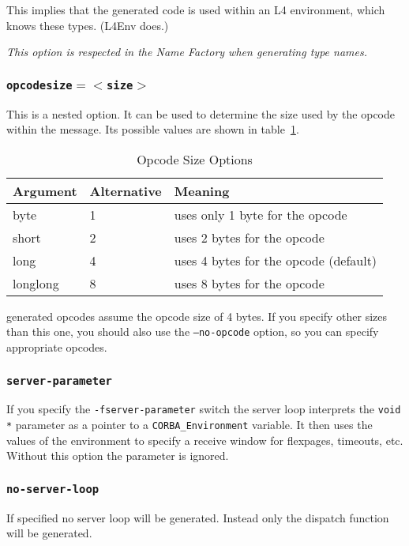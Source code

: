 This implies that the generated code is used within an L4 environment, which
knows these types. (L4Env does.)

{\it This option is respected in the Name Factory when generating type names.}

\subsubsection{{\tt opcodesize$=<$size$>$}}
This is a nested option. It can be used to determine the
size used by the opcode within the message. Its possible values are shown in
table~\ref{tab:opcodesize}.

\begin{table}[htb]
\begin{center}
\begin{tabular}{|l|l|l|} \hline
Argument & Alternative & Meaning \\ \hline \hline
byte & 1 & uses only 1 byte for the opcode \\ \hline
short & 2 & uses 2 bytes for the opcode \\ \hline
long & 4 & uses 4 bytes for the opcode (default) \\ \hline
longlong & 8 & uses 8 bytes for the opcode \\ \hline
\end{tabular}
\caption{\label{tab:opcodesize} Opcode Size Options}
\end{center}
\end{table}

\dice{} generated opcodes assume the opcode size of 4 bytes. If you specify
other sizes than this one, you should also use the {\tt --no-opcode} option,
so you can specify appropriate opcodes.

\subsubsection{{\tt server-parameter}}
If you specify the \verb|-fserver-parameter| switch the server
loop interprets the \verb|void *| parameter as  a pointer to a
\verb|CORBA_Environment| variable. It then uses the values of the 
environment to specify a
receive window for flexpages, timeouts, etc. 
Without this option the parameter is ignored.

\subsubsection{{\tt no-server-loop}}
If specified no server loop will be generated. Instead only the
dispatch function will be generated.

